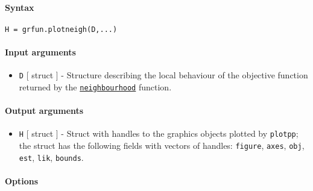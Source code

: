 


	\paragraph{Syntax}\label{syntax}

\begin{verbatim}
H = grfun.plotneigh(D,...)
\end{verbatim}

\paragraph{Input arguments}\label{input-arguments}

\begin{itemize}
\itemsep1pt\parskip0pt
\item
  \texttt{D} {[} struct {]} - Structure describing the local behaviour
  of the objective function returned by the
  \href{model/neighbourhood}{\texttt{neighbourhood}} function.
\end{itemize}

\paragraph{Output arguments}\label{output-arguments}

\begin{itemize}
\itemsep1pt\parskip0pt
\item
  \texttt{H} {[} struct {]} - Struct with handles to the graphics
  objects plotted by \texttt{plotpp}; the struct has the following
  fields with vectors of handles: \texttt{figure}, \texttt{axes},
  \texttt{obj}, \texttt{est}, \texttt{lik}, \texttt{bounds}.
\end{itemize}

\paragraph{Options}\label{options}

